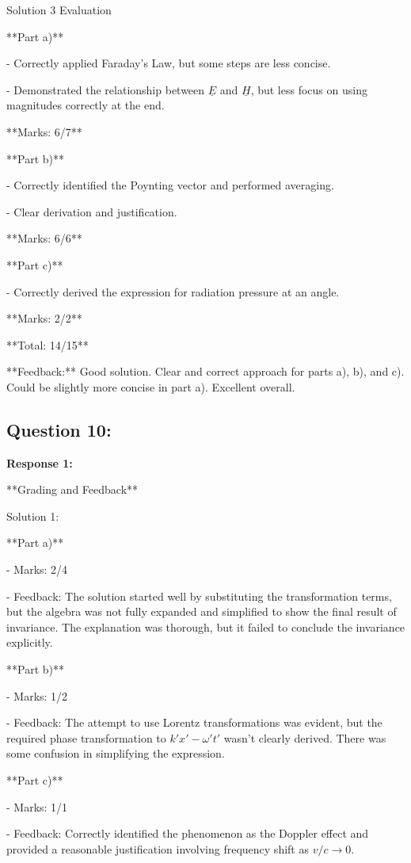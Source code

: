 \documentclass[a4paper,11pt]{article}
\begin{document}
Solution 3 Evaluation

**Part a)**

- Correctly applied Faraday's Law, but some steps are less concise.

- Demonstrated the relationship between \(\underline{E}\) and \(\underline{H}\), but less focus on using magnitudes correctly at the end.

**Marks: 6/7**

**Part b)**

- Correctly identified the Poynting vector and performed averaging.

- Clear derivation and justification.

**Marks: 6/6**

**Part c)**

- Correctly derived the expression for radiation pressure at an angle.

**Marks: 2/2**

**Total: 14/15**

**Feedback:** Good solution. Clear and correct approach for parts a), b), and c). Could be slightly more concise in part a). Excellent overall.

\subsection*{Question 10:}

\textbf{Response 1:}

**Grading and Feedback**

Solution 1:

**Part a)**

- Marks: 2/4

- Feedback: The solution started well by substituting the transformation terms, but the algebra was not fully expanded and simplified to show the final result of invariance. The explanation was thorough, but it failed to conclude the invariance explicitly.

**Part b)**

- Marks: 1/2

- Feedback: The attempt to use Lorentz transformations was evident, but the required phase transformation to \( k'x' - \omega' t' \) wasn't clearly derived. There was some confusion in simplifying the expression.

**Part c)**

- Marks: 1/1

- Feedback: Correctly identified the phenomenon as the Doppler effect and provided a reasonable justification involving frequency shift as \( v/c \to 0 \).
\end{document}
